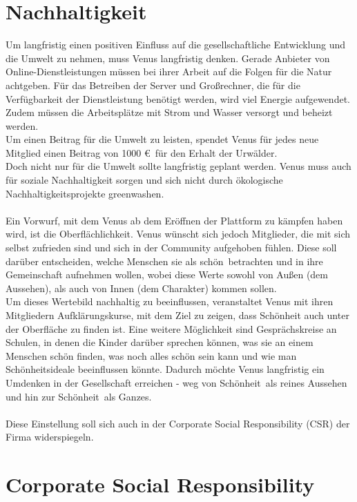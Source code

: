 \documentclass[a4paper, fontsize=12pt, parskip=full, toc=bibliographynumbered]{scrreprt}
\begin{document}
\section{Nachhaltigkeit}
\author{Autor: Leonie Schiburr}

Um langfristig einen positiven Einfluss auf die gesellschaftliche Entwicklung und die Umwelt zu nehmen, muss Venus langfristig denken.
Gerade Anbieter von Online-Dienstleistungen müssen bei ihrer Arbeit auf die Folgen für die Natur achtgeben. Für das Betreiben der Server und
Großrechner, die für die Verfügbarkeit der Dienstleistung benötigt werden, wird viel Energie aufgewendet. Zudem müssen die Arbeitsplätze mit Strom 
und Wasser versorgt und beheizt werden.\\
Um einen Beitrag für die Umwelt zu leisten, spendet Venus für jedes neue Mitglied einen Beitrag von 1000 \euro~für den Erhalt der Urwälder. \\
Doch nicht nur für die Umwelt sollte langfristig geplant werden. Venus muss auch für soziale Nachhaltigkeit sorgen und sich nicht durch ökologische Nachhaltigkeitsprojekte \glqq greenwashen\grqq.\\
\\
Ein Vorwurf, mit dem Venus ab dem Eröffnen der Plattform zu kämpfen haben wird, ist die \glqq Oberflächlichkeit\grqq. Venus wünscht sich jedoch Mitglieder, die mit sich selbst zufrieden sind und sich in der Community aufgehoben fühlen. Diese soll darüber entscheiden, welche Menschen sie als \glqq schön\grqq~betrachten und in ihre Gemeinschaft aufnehmen wollen, wobei diese Werte sowohl von Außen (dem Aussehen), als auch von Innen (dem Charakter) kommen sollen.\\
Um dieses Wertebild nachhaltig zu beeinflussen, veranstaltet Venus mit ihren Mitgliedern Aufklärungskurse, mit dem Ziel zu zeigen, dass Schönheit auch unter der Oberfläche zu finden ist. Eine weitere Möglichkeit sind Gesprächskreise an Schulen, in denen die Kinder darüber sprechen können, was sie an einem Menschen schön finden, was noch alles schön sein kann und wie man Schönheitsideale beeinflussen könnte. Dadurch möchte Venus langfristig ein Umdenken in der Gesellschaft erreichen - weg von \glqq Schönheit\grqq~als reines Aussehen und hin zur \glqq Schönheit\grqq~als Ganzes.\\
\\
Diese Einstellung soll sich auch in der Corporate Social Responsibility (CSR) der Firma widerspiegeln.

\section{Corporate Social Responsibility}
\end{document}
